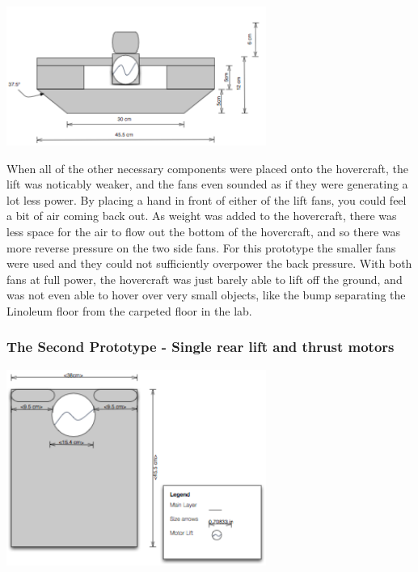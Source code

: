 \begin{center}
  \includegraphics[width=85mm]{imageSources/SideView2.png}
\end{center}
\label{Side2}

When all of the other necessary components were placed onto the hovercraft, the lift was noticably weaker, and the fans
even sounded as if they were generating a lot less power. By placing a hand in front of either of the lift fans, you could feel
a bit of air coming back out. As weight was added to the hovercraft, there was less space for the air to flow out the bottom
of the hovercraft, and so there was more reverse pressure on the two side fans. For this prototype the smaller fans were used
and they could not sufficiently overpower the back pressure. With both fans at full power, the hovercraft was just barely able
to lift off the ground, and was not even able to hover over very small objects, like the bump separating the Linoleum floor
from the carpeted floor in the lab. 

\subsubsection{The Second Prototype - Single rear lift and thrust motors}

\begin{center}
  \includegraphics[width=85mm]{imageSources/Topfinal.png}
\end{center}
\label{finaltop}

